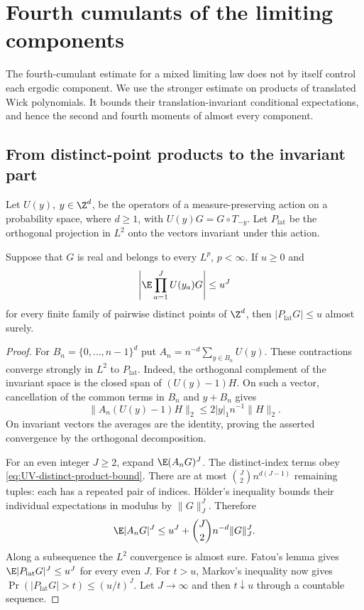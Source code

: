\section{Fourth cumulants of the limiting components}
\label{sec:ultraviolet-limits}

The fourth-cumulant estimate for a mixed limiting law does not by
itself control each ergodic component. We use the stronger estimate
on products of translated Wick polynomials. It bounds their
translation-invariant conditional expectations, and hence the
second and fourth moments of almost every component.

\subsection{From distinct-point products to the invariant part}

Let $U(y)$,
$y\in\Z^d$, be the operators of a measure-preserving action on
a probability space, where $d\ge1$, with $U(y)G=G\circ T_{-y}$. Let
$P_{\mathrm{lat}}$ be the orthogonal projection in $L^2$ onto
the vectors invariant under this action.

\begin{lemma}\label{lem:UV-invariant-product-bound}
Suppose that $G$ is real and belongs to every $L^p$, $p<\infty$.
If $u\ge0$ and
\begin{equation}\label{eq:UV-distinct-product-bound}
 \left|\E\prod_{a=1}^J U(y_a)G\right|\le u^J
\end{equation}
for every finite family of pairwise distinct points of $\Z^d$,
then $|P_{\mathrm{lat}}G|\le u$ almost surely.
\end{lemma}

\begin{proof}
For $B_n=\{0,\ldots,n-1\}^d$ put
$A_n=n^{-d}\sum_{y\in B_n}U(y)$. These contractions converge
strongly in $L^2$ to $P_{\mathrm{lat}}$.
Indeed, the orthogonal complement of the invariant space is the
closed span of $(U(y)-1)H$. On such a vector, cancellation of
the common terms in $B_n$ and $y+B_n$ gives
\[
 \|A_n(U(y)-1)H\|_2\le2|y|_1n^{-1}\|H\|_2.
\]
On invariant vectors the averages are the identity, proving
the asserted convergence by the orthogonal decomposition.

For an even integer $J\ge2$, expand $\E(A_nG)^J$.
The distinct-index terms obey \eqref{eq:UV-distinct-product-bound}.
There are at most $\binom J2 n^{d(J-1)}$ remaining tuples:
each has a repeated pair of indices. H\"older's inequality
bounds their individual expectations in modulus by
$\|G\|_J^J$. Therefore
\[
 \E|A_nG|^J
       \le u^J+\binom J2 n^{-d}\|G\|_J^J.
\]
Along a subsequence the $L^2$ convergence is almost sure.
Fatou's lemma gives $\E|P_{\mathrm{lat}}G|^J\le u^J$
for every even $J$. For $t>u$, Markov's inequality now gives
$\Pr(|P_{\mathrm{lat}}G|>t)\le(u/t)^J$.
Let $J\to\infty$ and then $t\downarrow u$ through a countable
sequence.
\end{proof}

